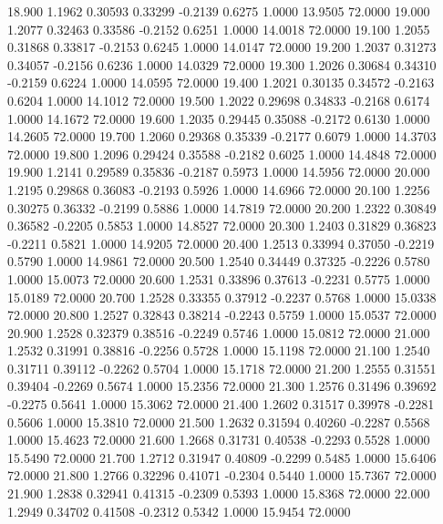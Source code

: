   18.900   1.1962   0.30593   0.33299  -0.2139   0.6275   1.0000  13.9505  72.0000
  19.000   1.2077   0.32463   0.33586  -0.2152   0.6251   1.0000  14.0018  72.0000
  19.100   1.2055   0.31868   0.33817  -0.2153   0.6245   1.0000  14.0147  72.0000
  19.200   1.2037   0.31273   0.34057  -0.2156   0.6236   1.0000  14.0329  72.0000
  19.300   1.2026   0.30684   0.34310  -0.2159   0.6224   1.0000  14.0595  72.0000
  19.400   1.2021   0.30135   0.34572  -0.2163   0.6204   1.0000  14.1012  72.0000
  19.500   1.2022   0.29698   0.34833  -0.2168   0.6174   1.0000  14.1672  72.0000
  19.600   1.2035   0.29445   0.35088  -0.2172   0.6130   1.0000  14.2605  72.0000
  19.700   1.2060   0.29368   0.35339  -0.2177   0.6079   1.0000  14.3703  72.0000
  19.800   1.2096   0.29424   0.35588  -0.2182   0.6025   1.0000  14.4848  72.0000
  19.900   1.2141   0.29589   0.35836  -0.2187   0.5973   1.0000  14.5956  72.0000
  20.000   1.2195   0.29868   0.36083  -0.2193   0.5926   1.0000  14.6966  72.0000
  20.100   1.2256   0.30275   0.36332  -0.2199   0.5886   1.0000  14.7819  72.0000
  20.200   1.2322   0.30849   0.36582  -0.2205   0.5853   1.0000  14.8527  72.0000
  20.300   1.2403   0.31829   0.36823  -0.2211   0.5821   1.0000  14.9205  72.0000
  20.400   1.2513   0.33994   0.37050  -0.2219   0.5790   1.0000  14.9861  72.0000
  20.500   1.2540   0.34449   0.37325  -0.2226   0.5780   1.0000  15.0073  72.0000
  20.600   1.2531   0.33896   0.37613  -0.2231   0.5775   1.0000  15.0189  72.0000
  20.700   1.2528   0.33355   0.37912  -0.2237   0.5768   1.0000  15.0338  72.0000
  20.800   1.2527   0.32843   0.38214  -0.2243   0.5759   1.0000  15.0537  72.0000
  20.900   1.2528   0.32379   0.38516  -0.2249   0.5746   1.0000  15.0812  72.0000
  21.000   1.2532   0.31991   0.38816  -0.2256   0.5728   1.0000  15.1198  72.0000
  21.100   1.2540   0.31711   0.39112  -0.2262   0.5704   1.0000  15.1718  72.0000
  21.200   1.2555   0.31551   0.39404  -0.2269   0.5674   1.0000  15.2356  72.0000
  21.300   1.2576   0.31496   0.39692  -0.2275   0.5641   1.0000  15.3062  72.0000
  21.400   1.2602   0.31517   0.39978  -0.2281   0.5606   1.0000  15.3810  72.0000
  21.500   1.2632   0.31594   0.40260  -0.2287   0.5568   1.0000  15.4623  72.0000
  21.600   1.2668   0.31731   0.40538  -0.2293   0.5528   1.0000  15.5490  72.0000
  21.700   1.2712   0.31947   0.40809  -0.2299   0.5485   1.0000  15.6406  72.0000
  21.800   1.2766   0.32296   0.41071  -0.2304   0.5440   1.0000  15.7367  72.0000
  21.900   1.2838   0.32941   0.41315  -0.2309   0.5393   1.0000  15.8368  72.0000
  22.000   1.2949   0.34702   0.41508  -0.2312   0.5342   1.0000  15.9454  72.0000
